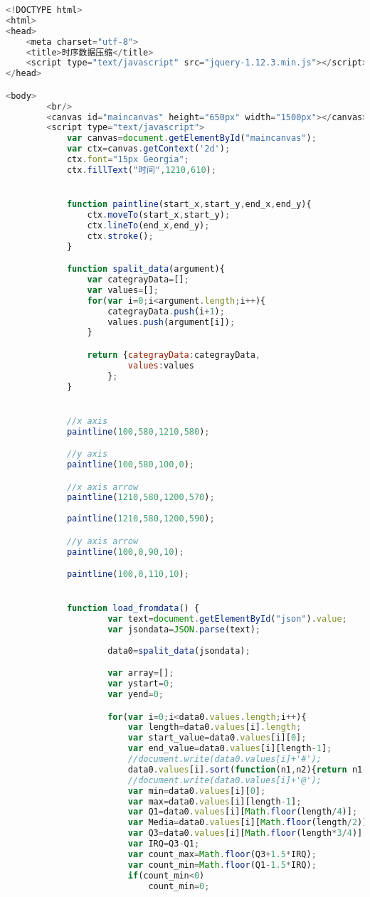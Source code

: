 \begin{lstlisting}[language = javascript]
<!DOCTYPE html>
<html>
<head>
	<meta charset="utf-8">
	<title>时序数据压缩</title>
	<script type="text/javascript" src="jquery-1.12.3.min.js"></script>
</head>

<body>
		<br/>
		<canvas id="maincanvas" height="650px" width="1500px"></canvas>
		<script type="text/javascript">
			var canvas=document.getElementById("maincanvas");
			var ctx=canvas.getContext('2d');
			ctx.font="15px Georgia";
			ctx.fillText("时间",1210,610);


			function paintline(start_x,start_y,end_x,end_y){
				ctx.moveTo(start_x,start_y);
			    ctx.lineTo(end_x,end_y);
			    ctx.stroke();
			}

			function spalit_data(argument){
				var categrayData=[];
				var values=[];
				for(var i=0;i<argument.length;i++){
					categrayData.push(i+1);
					values.push(argument[i]);
				}

				return {categrayData:categrayData,
						values:values
					};
			}


			//x axis
			paintline(100,580,1210,580);

			//y axis
			paintline(100,580,100,0);

			//x axis arrow
			paintline(1210,580,1200,570);
			
			paintline(1210,580,1200,590);

			//y axis arrow 
			paintline(100,0,90,10);

			paintline(100,0,110,10);


			function load_fromdata() {
					var text=document.getElementById("json").value;
					var jsondata=JSON.parse(text);
					
					data0=spalit_data(jsondata);

					var array=[];
					var ystart=0;
					var yend=0;

					for(var i=0;i<data0.values.length;i++){
						var length=data0.values[i].length;
						var start_value=data0.values[i][0];
						var end_value=data0.values[i][length-1];
						//document.write(data0.values[i]+'#');
						data0.values[i].sort(function(n1,n2){return n1-n2;});
						//document.write(data0.values[i]+'@');
						var min=data0.values[i][0];
						var max=data0.values[i][length-1];
						var Q1=data0.values[i][Math.floor(length/4)];
						var Media=data0.values[i][Math.floor(length/2)];
						var Q3=data0.values[i][Math.floor(length*3/4)];
						var IRQ=Q3-Q1;
						var count_max=Math.floor(Q3+1.5*IRQ);
						var count_min=Math.floor(Q1-1.5*IRQ);
						if(count_min<0)
							count_min=0;


\end{lstlisting}
